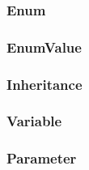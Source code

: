 \subsubsection{Enum}

\subsubsection{EnumValue}

\subsubsection{Inheritance}

\subsubsection{Variable}

\subsubsection{Parameter}
